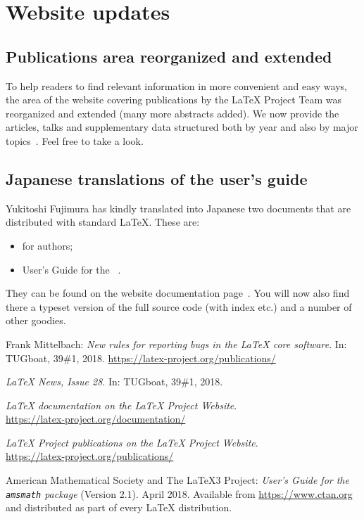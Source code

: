 \documentclass{ltnews}
\begin{document}
\section{Website updates}

\subsection{Publications area reorganized and extended}

To help readers to find relevant information in more convenient and
easy ways, the area of the website covering publications by the
\LaTeX{} Project Team was reorganized and extended (many more
abstracts added). We now provide the articles, talks and supplementary
data structured both by year and also by major
topics~\cite{site-pub}. Feel free to take a look.

\subsection{Japanese translations of the user's guide}

Yukitoshi Fujimura has kindly translated
into Japanese two documents that are
distributed with standard \LaTeX{}.
These are: 
\begin{itemize}
\item
    \LaTeXe{} for authors;
\item
    User's Guide for the ~\cite{amsldoc}.
\end{itemize}
They can be found on the website documentation page~\cite{site-doc}.
You will now also find there a typeset version of the full \LaTeXe{}
source code (with index etc.\@) and a number of other goodies.


      

\begin{thebibliography}{9}
  
 Frank Mittelbach:
  \emph{New rules for reporting bugs in the \LaTeX{} core software}.  
  In: TUGboat, 39\#1, 2018.
  \url{https://latex-project.org/publications/}

  \emph{\LaTeX{} News, Issue 28}.  
  In: TUGboat, 39\#1, 2018.\\

  \emph{\LaTeX{} documentation on the \LaTeX{} Project Website}.\\  
  \url{https://latex-project.org/documentation/}

  \emph{\LaTeX{} Project publications on the \LaTeX{} Project Website}.\\
  \url{https://latex-project.org/publications/}

 American Mathematical Society and The \LaTeX3 Project:
  \emph{User's Guide for the \texttt{amsmath} package} (Version 2.1).  
  April 2018.
  Available from
  \url{https://www.ctan.org}
  and distributed as part of every \LaTeX{} distribution.

\end{thebibliography}
\end{document}
